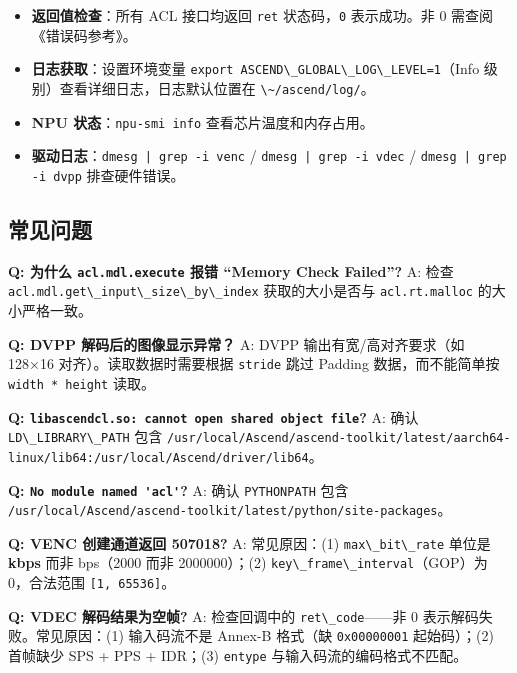 \begin{itemize}
\tightlist
\item
  \textbf{返回值检查}：所有 ACL 接口均返回 \passthrough{\lstinline!ret!}
  状态码，\passthrough{\lstinline!0!} 表示成功。非 0
  需查阅《错误码参考》。
\item
  \textbf{日志获取}：设置环境变量
  \passthrough{\lstinline!export ASCEND\_GLOBAL\_LOG\_LEVEL=1!}（Info
  级别）查看详细日志，日志默认位置在
  \passthrough{\lstinline!\~/ascend/log/!}。
\item
  \textbf{NPU 状态}：\passthrough{\lstinline!npu-smi info!}
  查看芯片温度和内存占用。
\item
  \textbf{驱动日志}：\passthrough{\lstinline!dmesg | grep -i venc!} /
  \passthrough{\lstinline!dmesg | grep -i vdec!} /
  \passthrough{\lstinline!dmesg | grep -i dvpp!} 排查硬件错误。
\end{itemize}

\subsection{常见问题}\label{src-book-chapter6-h160}

\textbf{Q: 为什么 \passthrough{\lstinline!acl.mdl.execute!} 报错
``Memory Check Failed''?} A: 检查
\passthrough{\lstinline!acl.mdl.get\_input\_size\_by\_index!}
获取的大小是否与 \passthrough{\lstinline!acl.rt.malloc!}
的大小严格一致。

\textbf{Q: DVPP 解码后的图像显示异常？} A: DVPP 输出有宽/高对齐要求（如
128×16 对齐）。读取数据时需要根据 \passthrough{\lstinline!stride!} 跳过
Padding 数据，而不能简单按 \passthrough{\lstinline!width * height!}
读取。

\textbf{Q:
\passthrough{\lstinline!libascendcl.so: cannot open shared object file!}?}
A: 确认 \passthrough{\lstinline!LD\_LIBRARY\_PATH!} 包含
\passthrough{\lstinline!/usr/local/Ascend/ascend-toolkit/latest/aarch64-linux/lib64:/usr/local/Ascend/driver/lib64!}。

\textbf{Q: \passthrough{\lstinline!No module named 'acl'!}?} A: 确认
\passthrough{\lstinline!PYTHONPATH!} 包含
\passthrough{\lstinline!/usr/local/Ascend/ascend-toolkit/latest/python/site-packages!}。

\textbf{Q: VENC 创建通道返回 507018?} A: 常见原因：(1)
\passthrough{\lstinline!max\_bit\_rate!} 单位是 \textbf{kbps} 而非
bps（2000 而非 2000000）；(2)
\passthrough{\lstinline!key\_frame\_interval!}（GOP）为 0，合法范围
\passthrough{\lstinline![1, 65536]!}。

\textbf{Q: VDEC 解码结果为空帧?} A: 检查回调中的
\passthrough{\lstinline!ret\_code!}------非 0
表示解码失败。常见原因：(1) 输入码流不是 Annex-B 格式（缺
\passthrough{\lstinline!0x00000001!} 起始码）；(2) 首帧缺少 SPS + PPS +
IDR；(3) \passthrough{\lstinline!entype!} 与输入码流的编码格式不匹配。

